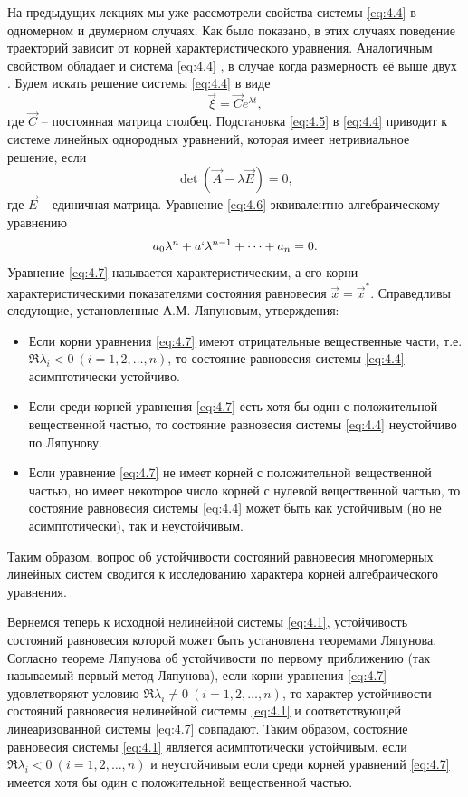 На предыдущих лекциях мы уже рассмотрели свойства системы \eqref{eq:4.4}  в одномерном и двумерном случаях. Как было показано, в этих случаях поведение траекторий зависит от корней характеристического уравнения. Аналогичным свойством обладает и система \eqref{eq:4.4} , в случае когда размерность её выше двух . Будем искать решение системы \eqref{eq:4.4} в виде
\begin{equation}
        \label{eq:4.5}
\vec \xi = \vec C e^{\lambda t},
\end{equation}
где $\vec C$ -- постоянная матрица столбец. Подстановка \eqref{eq:4.5} в \eqref{eq:4.4} приводит к системе линейных однородных уравнений, которая имеет нетривиальное решение, если 
\begin{equation}
        \label{eq:4.6}
        \det(\vec A - \lambda \vec E) =0,
\end{equation}
где $\vec  E$ -- единичная матрица. Уравнение \eqref{eq:4.6} эквивалентно алгебраическому уравнению
\begin{equation}
        \label{eq:4.7}
        a_0 \lambda^n + a` \lambda^{n-1} + \dots + a_n =0.
\end{equation}
Уравнение \eqref{eq:4.7} называется характеристическим, а его корни характеристическими показателями состояния равновесия $\vec x =\vec x^*$. 
Справедливы следующие, установленные А.М. Ляпуновым, утверждения:
\begin{itemize}
        \item Если корни уравнения \eqref{eq:4.7} имеют отрицательные вещественные части, т.е. $\Re \lambda_i < 0 ~ (i= 1,2,\dots,n)$, то состояние равновесия системы \eqref{eq:4.4} асимптотически устойчиво.
 \item Если среди корней уравнения \eqref{eq:4.7} есть хотя бы один с положительной вещественной частью, то состояние равновесия системы \eqref{eq:4.4} неустойчиво по Ляпунову.
 \item  Если уравнение \eqref{eq:4.7} не имеет корней с положительной вещественной частью, но имеет некоторое число корней с нулевой вещественной частью, то состояние равновесия системы \eqref{eq:4.4} может быть как устойчивым (но не асимптотически), так и неустойчивым.
\end{itemize}
Таким образом, вопрос об устойчивости состояний равновесия многомерных линейных систем сводится к исследованию характера корней алгебраического уравнения.

Вернемся теперь к исходной нелинейной системы \eqref{eq:4.1},
устойчивость состояний равновесия которой может быть установлена теоремами Ляпунова. Согласно теореме Ляпунова об устойчивости по первому приближению (так называемый первый метод Ляпунова), если корни уравнения \eqref{eq:4.7} удовлетворяют условию $\Re \lambda_i \neq 0~ (i=1,2,\dots,n)$, то характер устойчивости состояний равновесия нелинейной системы \eqref{eq:4.1} и соответствующей линеаризованной системы \eqref{eq:4.7} совпадают. Таким образом, состояние равновесия системы \eqref{eq:4.1} является асимптотически устойчивым, если $\Re \lambda_i<0~ (i=1,2,\dots,n) $ и неустойчивым если среди корней уравнений \eqref{eq:4.7} имеется хотя бы один с положительной вещественной частью.

